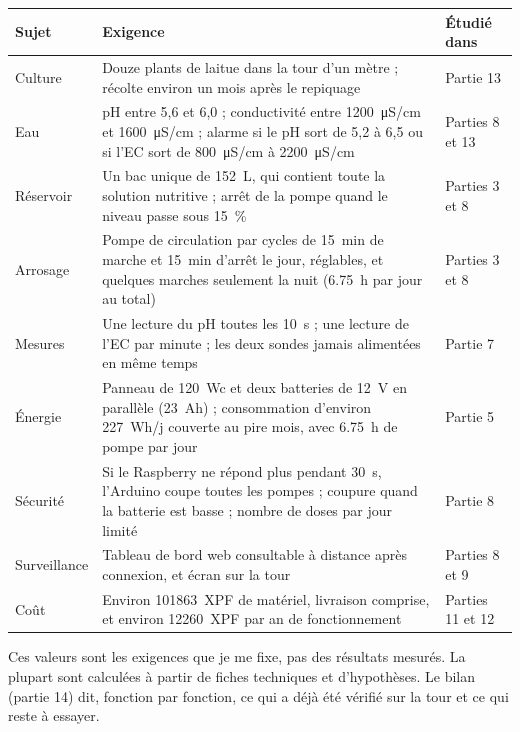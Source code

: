 \begin{center}
\renewcommand{\arraystretch}{1.15}
\begin{tabularx}{\textwidth}{|>{\raggedright\arraybackslash}p{2.7cm}|Y|>{\raggedright\arraybackslash}p{2.4cm}|}
\hline
\textbf{Sujet} & \textbf{Exigence} & \textbf{Étudié dans} \\
\hline
Culture & Douze plants de laitue dans la tour d'un mètre ; récolte environ un mois après le repiquage & Partie 13 \\
\hline
Eau & pH entre 5,6 et 6,0 ; conductivité entre \qty{1200}{\micro S/cm} et \qty{1600}{\micro S/cm} ; alarme si le pH sort de 5,2 à 6,5 ou si l'EC sort de \qty{800}{\micro S/cm} à \qty{2200}{\micro S/cm} & Parties 8 et 13 \\
\hline
Réservoir & Un bac unique de \qty{152}{L}, qui contient toute la solution nutritive ; arrêt de la pompe quand le niveau passe sous \qty{15}{\percent} & Parties 3 et 8 \\
\hline
Arrosage & Pompe de circulation par cycles de \qty{15}{min} de marche et \qty{15}{min} d'arrêt le jour, réglables, et quelques marches seulement la nuit (\qty{6,75}{h} par jour au total) & Parties 3 et 8 \\
\hline
Mesures & Une lecture du pH toutes les \qty{10}{s} ; une lecture de l'EC par minute ; les deux sondes jamais alimentées en même temps & Partie 7 \\
\hline
Énergie & Panneau de \qty{120}{Wc} et deux batteries de \qty{12}{V} en parallèle (\qty{23}{Ah}) ; consommation d'environ \qty{227}{Wh/j} couverte au pire mois, avec \qty{6,75}{h} de pompe par jour & Partie 5 \\
\hline
Sécurité & Si le Raspberry ne répond plus pendant \qty{30}{s}, l'Arduino coupe toutes les pompes ; coupure quand la batterie est basse ; nombre de doses par jour limité & Partie 8 \\
\hline
Surveillance & Tableau de bord web consultable à distance après connexion, et écran sur la tour & Parties 8 et 9 \\
\hline
Coût & Environ \qty{101863}{XPF} de matériel, livraison comprise, et environ \qty{12260}{XPF} par an de fonctionnement & Parties 11 et 12 \\
\hline
\end{tabularx}
\end{center}

\begin{attention}
Ces valeurs sont les exigences que je me fixe, pas des résultats mesurés. La plupart sont calculées à partir de fiches techniques et d'hypothèses. Le bilan (partie 14) dit, fonction par fonction, ce qui a déjà été vérifié sur la tour et ce qui reste à essayer.
\end{attention}

